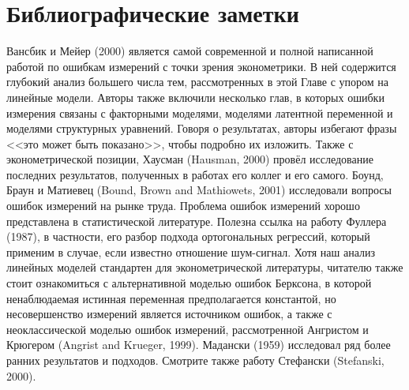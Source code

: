 \section{Библиографические заметки} 
Вансбик и Мейер (2000) является самой современной и полной написанной работой по ошибкам измерений с точки зрения эконометрики. В ней содержится глубокий анализ большего числа тем, рассмотренных в этой Главе с упором на линейные модели. Авторы также включили несколько глав, в которых ошибки измерения связаны с факторными моделями, моделями латентной переменной и моделями структурных уравнений. Говоря о результатах, авторы избегают фразы <<это может быть показано>>, чтобы подробно их изложить. Также с эконометрической позиции, Хаусман (Hausman, 2000) провёл исследование последних результатов, полученных в работах его коллег и его самого. Боунд, Браун и Матиевец (Bound, Brown and Mathiowets, 2001) исследовали вопросы ошибок измерений на рынке труда.
Проблема ошибок измерений хорошо представлена в статистической литературе. Полезна ссылка на работу Фуллера (1987), в частности, его разбор подхода ортогональных регрессий, который применим в случае, если известно отношение шум-сигнал. Хотя наш анализ линейных моделей стандартен для эконометрической литературы, читателю также стоит ознакомиться с альтернативной моделью ошибок Берксона, в которой ненаблюдаемая истинная переменная предполагается константой, но несовершенство измерений является источником ошибок, а также с неоклассической моделью ошибок измерений, рассмотренной Ангристом и Крюгером (Angrist and Krueger, 1999). Мадански (1959) исследовал ряд более ранних результатов и подходов. Смотрите также работу Стефански (Stefanski, 2000).
